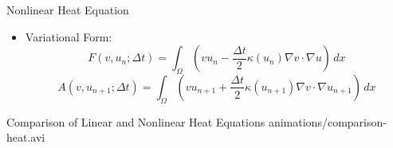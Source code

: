 \documentclass[serif]{beamer}
\begin{document}
\begin{frame}{Nonlinear Heat Equation}
    \begin{itemize}
				
				\vspace{-3em}
        \item Variational Form:
					\[
						F(v, u_n; \Delta t) = \int_\Omega \left(v u_n - \frac{\Delta t}{2} \kappa(u_n) \nabla v \cdot \nabla u\right) \, dx
					\] 
					\[
						A(v, u_{n+1}; \Delta t) = \int_\Omega \left(v u_{n+1} + \frac{\Delta t}{2} \kappa(u_{n+1}) \nabla v \cdot \nabla u_{n+1}\right) \, dx
					\] 
				\end{itemize}
\end{frame}

\begin{frame}{Comparison of Linear and Nonlinear Heat Equations}
	\centering
	{animations/comparison-heat.avi}
\end{frame}
\end{document}
